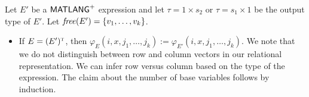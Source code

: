  Let $E'$ be a $\mathsf{MATLANG}^{\sf +}$ expression and let $\tau = 1 \times s_2$ or $\tau=s_1\times 1$ be the output type of $E'$. Let $\operatorname{\mathit{free}}(E')=\{v_1,\ldots,v_k\}$.
 \begin{itemize}
\item If $E= (E')^{\textsc{t}}$, then $\varphi_E(i,x,j_1,\ldots,j_k):=\varphi_{E'}(i,x,j_1,\ldots,j_k)$. We note that we do not distinguish between row and column vectors in our relational representation. We can infer row versus column based on the type of the expression. The claim about the number of base variables follows by induction.
\end{itemize}

